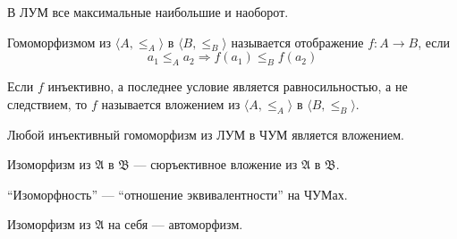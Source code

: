 \documentclass[12pt,a4paper]{article}
\begin{document}
    \begin{statement}
        В ЛУМ все максимальные наибольшие и наоборот.
    \end{statement}

    \begin{definition}
        Гомоморфизмом из $\langle A, \leqslant_A \rangle$ в $\langle B, \leqslant_B \rangle$ называется отображение $f: A \to B$, если
        \[
            a_1 \leqslant_A a_2 \Rightarrow f(a_1) \leqslant_B f(a_2)
        \]

        Если $f$ инъективно, а последнее условие является равносильностью, а не следствием, то $f$ называется вложением из $\langle A, \leqslant_A \rangle$ в $\langle B, \leqslant_B \rangle$.
    \end{definition}

    \begin{statement}
        Любой инъективный гомоморфизм из ЛУМ в ЧУМ является вложением.
    \end{statement}

    \begin{definition}
        Изоморфизм из $\mathfrak{A}$ в $\mathfrak{B}$ --- сюръективное вложение из $\mathfrak{A}$ в $\mathfrak{B}$.
    \end{definition}

    \begin{statement}
        ``Изоморфность'' --- ``отношение эквивалентности'' на ЧУМах.
    \end{statement}

    \begin{definition}
        Изоморфизм из $\mathfrak{A}$ на себя --- автоморфизм.
    \end{definition}

    
\end{document}
